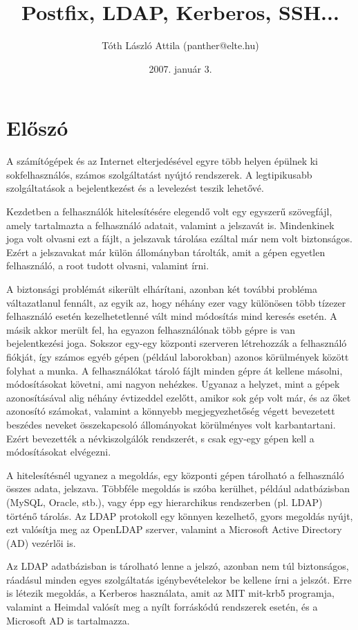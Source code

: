 \documentclass[fleqn,10pt,a4paper,titlepage]{article}
\title{Postfix, LDAP, Kerberos, SSH...}
\author{Tóth László Attila (panther@elte.hu)}
\date{2007. január 3.}
\newcommand{\mktoc}{
  \pagenumbering{roman}
  \setcounter{page}{1}
  \lhead{\textbf{\thepage}}
  \cfoot{}
  \tableofcontents
  \newpage
  \lhead{\textbf{\thepage}}
  \pagenumbering{arabic}
  \setcounter{page}{1}
}
\begin{document}
  \maketitle
  \mktoc
  \newpage
  \section{Előszó}
  A számítógépek és az Internet elterjedésével egyre több helyen épülnek ki sokfelhasználós, számos szolgáltatást nyújtó
  rendszerek. A legtipikusabb szolgáltatások a bejelentkezést és a levelezést teszik lehetővé.

  Kezdetben a felhasználók hitelesítésére elegendő volt egy egyszerű szövegfájl, amely tartalmazta a felhasználó
  adatait, valamint a jelszavát is. Mindenkinek joga volt olvasni ezt a fájlt, a jelszavak tárolása ezáltal már nem volt
  biztonságos. Ezért a jelszavakat már külön állományban tárolták, amit a gépen egyetlen felhasználó, a root tudott
  olvasni, valamint írni.

  A biztonsági problémát sikerült elhárítani, azonban két további probléma váltazatlanul fennált, az egyik az, hogy
  néhány ezer vagy különösen több tízezer felhasználó esetén kezelhetetlenné vált mind módosítás mind keresés esetén. A
  másik akkor merült fel, ha egyazon felhasználónak több gépre is van bejelentkezési joga. Sokszor egy-egy központi
  szerveren létrehozzák a felhasználó fiókját, így számos egyéb gépen (például laborokban) azonos körülmények között
  folyhat a munka. A felhasználókat tároló fájlt minden gépre át kellene másolni, módosításokat követni, ami nagyon
  nehézkes. Ugyanaz a helyzet, mint a gépek azonosításával alig néhány évtizeddel ezelőtt, amikor sok gép volt már, és
  az őket azonosító számokat, valamint a könnyebb megjegyezhetőség végett bevezetett beszédes neveket összekapcsoló
  állományokat körülményes volt karbantartani. Ezért bevezették a névkiszolgálók rendszerét, s csak egy-egy gépen kell a
  módosításokat elvégezni.

  A hitelesítésnél ugyanez a megoldás, egy központi gépen tárolható a felhasználó összes adata, jelszava. Többféle
  megoldás is szóba kerülhet, például adatbázisban (MySQL, Oracle, stb.), vagy épp egy hierarchikus
  rendszerben  (pl. LDAP) történő tárolás. Az LDAP protokoll egy könnyen kezelhető, gyors megoldás nyújt, ezt valósítja
  meg az OpenLDAP szerver, valamint a Microsoft Active Directory (AD) vezérlői is. 

  Az LDAP adatbázisban is tárolható lenne a jelszó, azonban nem túl biztonságos, ráadásul minden egyes szolgáltatás
  igénybevételekor be kellene írni a jelszót. Erre is létezik megoldás, a Kerberos használata, amit az MIT mit-krb5
  programja, valamint a Heimdal valósít meg a nyílt forráskódú rendszerek esetén, és a Microsoft AD is tartalmazza.
\end{document}
